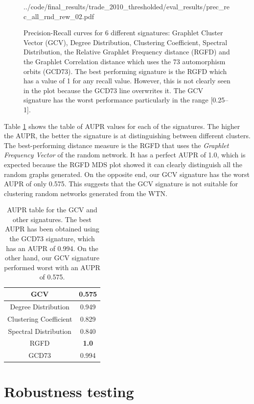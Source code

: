 \begin{figure}[H]
  {../code/final_results/trade_2010_thresholded/eval_results/prec_rec_all_rnd_rew_02.pdf}
  \caption[Precision-Recall curves for GCV and 5 other signatures]{Precision-Recall curves for 6 different signatures: Graphlet Cluster Vector (GCV), Degree Distribution, Clustering Coefficient, Spectral Distribution, the Relative Graphlet Frequency distance (RGFD) and the Graphlet Correlation distance which uses the 73 automorphism orbits (GCD73). The best performing signature is the RGFD which has a value of 1 for any recall value. However, this is not clearly seen in the plot because the GCD73 line overwrites it. The GCV signature has the worst performance particularly in the range [0.25--1].}
  \label{fig:prec_rec}
\end{figure}

Table \ref{tab:aupr} shows the table of AUPR values for each of the signatures. The higher the AUPR, the better the signature is at distinguishing between different clusters. The best-performing distance measure is the RGFD that uses the \emph{Graphlet Frequency Vector} of the random network. It has a perfect AUPR of 1.0, which is expected because the RGFD MDS plot showed it can clearly distinguish all the random graphs generated. On the opposite end, our GCV signature has the worst AUPR of only 0.575. This suggests that the GCV signature is not suitable for clustering random networks generated from the WTN. 

\begin{table}[H]
  \centering
  \begin{tabular}{  c | c }
    GCV & 0.575\\
    \hline
    Degree Distribution & 0.949\\
    Clustering Coefficient & 0.829\\
    Spectral Distribution & 0.840\\
    RGFD & \textbf{1.0}\\
    GCD73 & 0.994\\
  \end{tabular}
  \caption{AUPR table for the GCV and other signatures. The best AUPR has been obtained using the GCD73 signature, which has an AUPR of 0.994. On the other hand, our GCV signature performed worst with an AUPR of 0.575.}
  \label{tab:aupr}
\end{table}


\section{Robustness testing}


